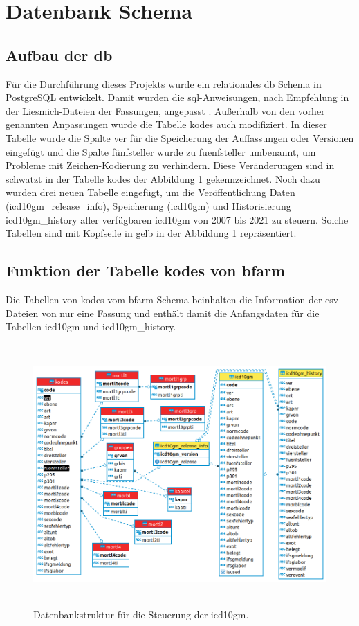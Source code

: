 \section{Datenbank Schema} \label{database}

\subsection{Aufbau der \acl{db}} \label{dbdevelop}

Für die Durchführung dieses Projekts wurde ein relationales \ac{db} Schema in PostgreSQL entwickelt. Damit wurden die \ac{sql}-Anweisungen, nach Empfehlung in der Liesmich-Dateien der Fassungen, angepasst \cite{readmel}. Außerhalb von den vorher genannten Anpassungen wurde die Tabelle \textsf{kodes} auch modifiziert. In dieser Tabelle wurde die Spalte \textsf{ver} für die Speicherung der Auffassungen oder Versionen eingefügt und die Spalte \textsf{fünfsteller} wurde zu \textsf{fuenfsteller} umbenannt, um Probleme mit Zeichen-Kodierung zu verhindern. Diese Veränderungen sind in schwatzt in der Tabelle \textsf{kodes} der Abbildung \ref{fig:reldb2} gekennzeichnet. Noch dazu wurden drei neuen Tabelle eingefügt, um die Veröffentlichung Daten (\textsf{icd10gm\_release\_info}), Speicherung (\textsf{icd10gm}) und Historisierung \textsf{icd10gm\_history} aller verfügbaren \ac{icd10gm} von 2007 bis 2021 zu steuern. Solche Tabellen sind mit Kopfseile in gelb in der Abbildung \ref{fig:reldb2} repräsentiert.

\subsection{Funktion der Tabelle \textsf{kodes} von \acs{bfarm}} \label{bfarmtables}

Die Tabellen von \textsf{kodes} vom \ac{bfarm}-Schema beinhalten die Information der \ac{csv}-Dateien von nur eine Fassung und enthält damit die Anfangsdaten für die Tabellen \textsf{icd10gm} und \textsf{icd10gm\_history}.

\clearpage	
\begin{figure}[ht]
	\centering
	\includegraphics[height=10cm]{figures/icdSqlSchemaNew}
	\caption[Datenbankstruktur]{Datenbankstruktur für die Steuerung der \ac{icd10gm}.}
	\label{fig:reldb2}
\end{figure}


